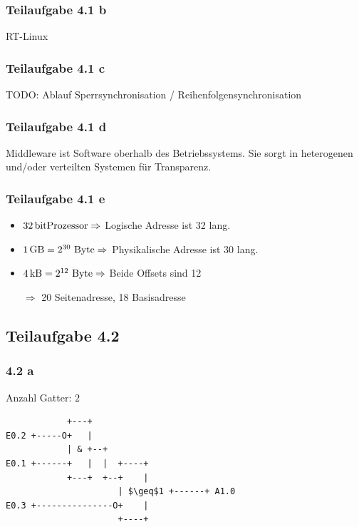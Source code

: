 \documentclass[a4paper]{scrartcl}
\begin{document}
  \subsubsection*{Teilaufgabe 4.1 b}
  RT-Linux 

  \subsubsection*{Teilaufgabe 4.1 c}
  TODO: Ablauf Sperrsynchronisation / Reihenfolgensynchronisation

  \subsubsection*{Teilaufgabe 4.1 d}
  Middleware ist Software oberhalb des Betriebssystems. Sie sorgt in
  heterogenen und/oder verteilten Systemen für Transparenz.

  \subsubsection*{Teilaufgabe 4.1 e}
  \begin{itemize}
      \item $\SI{32}{\bit}\text{Prozessor} \Rightarrow$ Logische
            Adresse ist \SI{32}{\bit} lang.
      \item $\SI{1}{\giga\byte}=2^{30}\text{ Byte} \Rightarrow$ Physikalische
            Adresse ist \SI{30}{\bit} lang.
      \item $\SI{4}{\kilo\byte}=2^{12}\text{ Byte} \Rightarrow$ Beide Offsets
            sind \SI{12}{\bit}
      \item[$\Rightarrow$] \SI{20}{\bit} Seitenadresse, \SI{18}{\bit} Basisadresse
  \end{itemize}

  \subsection*{Teilaufgabe 4.2}
  \subsubsection*{4.2 a}
  Anzahl Gatter: $2$
  \begin{lstlisting}
            +---+
E0.2 +-----O+   |
            | & +--+
E0.1 +------+   |  |  +----+
            +---+  +--+    |
                      | $\geq$1 +------+ A1.0
E0.3 +---------------O+    |
                      +----+
  \end{lstlisting}
\end{document}
